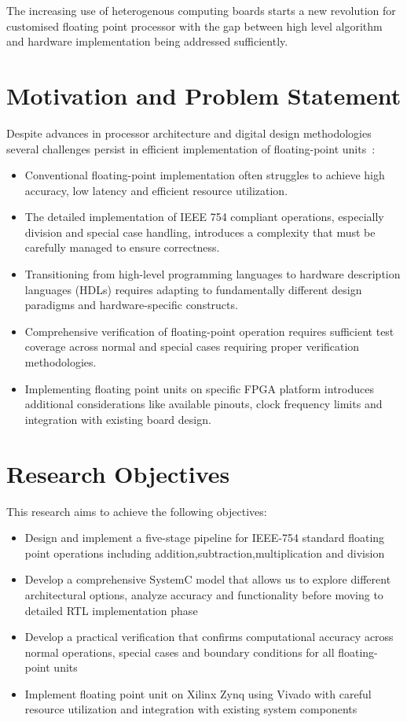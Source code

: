 The increasing use of heterogenous computing boards starts a new revolution for customised floating point processor with the gap between high level algorithm and hardware implementation being addressed sufficiently. \cite{ref6}

\section{Motivation and Problem Statement}
\label{sec:motivation}

Despite advances in processor architecture and digital design methodologies several challenges persist in efficient implementation of floating-point units~\cite{ref7}:

\begin{itemize}
\item Conventional floating-point implementation often struggles to achieve high accuracy, low latency and efficient resource utilization.
\item The detailed implementation of IEEE 754 compliant operations, especially division and special case handling, introduces a complexity that must be carefully managed to ensure correctness.
\item Transitioning from high-level programming languages to hardware description languages (HDLs) requires adapting to fundamentally different design paradigms and hardware-specific constructs.
\item Comprehensive verification of floating-point operation requires sufficient test coverage across normal and special cases requiring proper verification methodologies.
\item Implementing floating point units on specific FPGA platform introduces additional considerations like available pinouts, clock frequency limits and integration with existing board design.
\end{itemize}

\section{Research Objectives}
\label{sec:objectives}

This research aims to achieve the following objectives:

\begin{itemize}
\item Design and implement a five-stage pipeline for IEEE-754 standard floating point operations including addition,subtraction,multiplication and division
\item Develop a comprehensive SystemC model that allows us to explore different architectural options, analyze accuracy and functionality before moving to detailed RTL implementation phase
\item Develop a practical verification that confirms computational accuracy across normal operations, special cases and boundary conditions for all floating-point units
\item Implement floating point unit on Xilinx Zynq using Vivado with careful resource utilization and integration with existing system components
\end{itemize}

